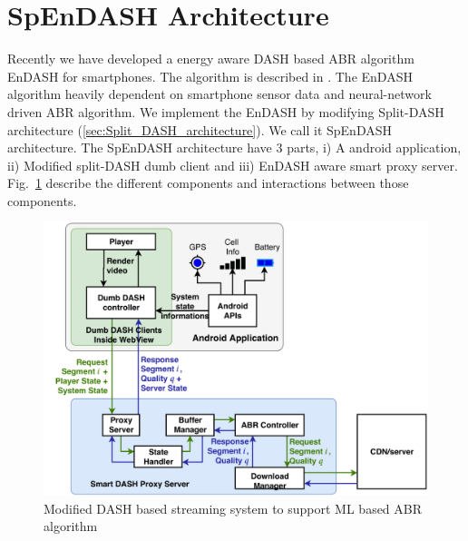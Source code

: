 

\section{SpEnDASH Architecture}
Recently we have developed a energy aware DASH based ABR algorithm EnDASH for smartphones. The algorithm is described in . The EnDASH algorithm heavily dependent on smartphone sensor data and neural-network driven ABR algorithm. We implement the EnDASH by modifying Split-DASH architecture (\ref{sec:Split_DASH_architecture}). We call it SpEnDASH architecture. The SpEnDASH architecture have 3 parts, i) A android application, ii) Modified split-DASH dumb client and iii) EnDASH aware smart proxy server. Fig.~\ref{fig:playerDiagram_SpEnDASH} describe the different components and interactions between those components.
\begin{figure}[h!]
	\begin{center}
		\includegraphics[width=0.9\linewidth]{img/playerDiagram_SpEnDASH}
	\end{center}
	\caption{\label{fig:playerDiagram_SpEnDASH} Modified DASH based streaming system to support ML based ABR algorithm}
\end{figure}

